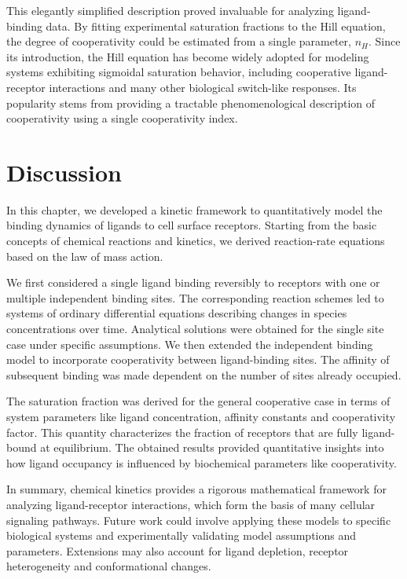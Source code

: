 This elegantly simplified description proved invaluable for analyzing ligand-binding data. By fitting experimental saturation fractions to the Hill equation, the degree of cooperativity could be estimated from a single parameter, $n_H$. Since its introduction, the Hill equation has become widely adopted for modeling systems exhibiting sigmoidal saturation behavior, including cooperative ligand-receptor interactions and many other biological switch-like responses. Its popularity stems from providing a tractable phenomenological description of cooperativity using a single cooperativity index.

\section{Discussion}

In this chapter, we developed a kinetic framework to quantitatively model the binding dynamics of ligands to cell surface receptors. Starting from the basic concepts of chemical reactions and kinetics, we derived reaction-rate equations based on the law of mass action.

We first considered a single ligand binding reversibly to receptors with one or multiple independent binding sites. The corresponding reaction schemes led to systems of ordinary differential equations describing changes in species concentrations over time. Analytical solutions were obtained for the single site case under specific assumptions. We then extended the independent binding model to incorporate cooperativity between ligand-binding sites. The affinity of subsequent binding was made dependent on the number of sites already occupied.

The saturation fraction was derived for the general cooperative case in terms of system parameters like ligand concentration, affinity constants and cooperativity factor. This quantity characterizes the fraction of receptors that are fully ligand-bound at equilibrium. The obtained results provided quantitative insights into how ligand occupancy is influenced by biochemical parameters like cooperativity.

In summary, chemical kinetics provides a rigorous mathematical framework for analyzing ligand-receptor interactions, which form the basis of many cellular signaling pathways. Future work could involve applying these models to specific biological systems and experimentally validating model assumptions and parameters. Extensions may also account for ligand depletion, receptor heterogeneity and conformational changes.
